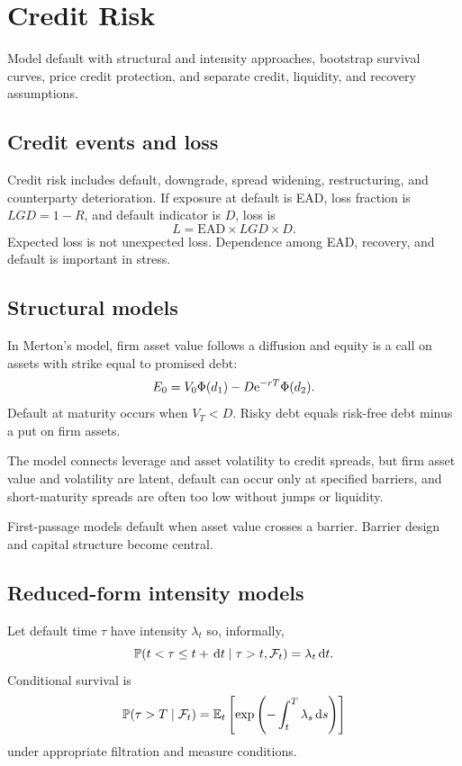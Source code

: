 \chapter{Credit Risk}

\begin{objectives}
Model default with structural and intensity approaches, bootstrap survival curves,
price credit protection, and separate credit, liquidity, and recovery assumptions.
\end{objectives}

\section{Credit events and loss}

Credit risk includes default, downgrade, spread widening, restructuring, and
counterparty deterioration. If exposure at default is EAD, loss fraction is
$LGD=1-R$, and default indicator is $D$, loss is
\[
L=\mathrm{EAD}\times LGD\times D.
\]
Expected loss is not unexpected loss. Dependence among EAD, recovery, and default is
important in stress.

\section{Structural models}

In Merton's model, firm asset value follows a diffusion and equity is a call on
assets with strike equal to promised debt:
\[
E_0=V_0\Phi(d_1)-D\mathrm e^{-rT}\Phi(d_2).
\]
Default at maturity occurs when $V_T<D$. Risky debt equals risk-free debt minus a put
on firm assets.

The model connects leverage and asset volatility to credit spreads, but firm asset
value and volatility are latent, default can occur only at specified barriers, and
short-maturity spreads are often too low without jumps or liquidity.

First-passage models default when asset value crosses a barrier. Barrier design and
capital structure become central.

\section{Reduced-form intensity models}

Let default time $\tau$ have intensity $\lambda_t$ so, informally,
\[
\mathbb P(t<\tau\leq t+\,\mathrm d t\mid\tau>t,\mathcal F_t)=\lambda_t\,\mathrm d t.
\]
Conditional survival is
\[
\mathbb P(\tau>T\mid\mathcal F_t)
=\operatorname{\mathbb E}_t\left[
\exp\left(-\int_t^T\lambda_s\,\mathrm d s\right)
\right]
\]
under appropriate filtration and measure conditions.

